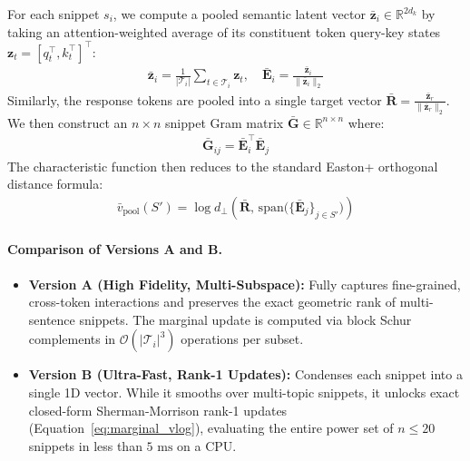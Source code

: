 \documentclass{article}
\begin{document}
For each snippet $s_i$, we compute a pooled semantic latent vector $\bar{\mathbf{z}}_i \in \mathbb{R}^{2d_k}$ by taking an attention-weighted average of its constituent token query-key states $\mathbf{z}_t = [q_t^\top, k_t^\top]^\top$:
\begin{align}
    \bar{\mathbf{z}}_i = \frac{1}{|\mathcal{T}_i|} \sum_{t \in \mathcal{T}_i} \mathbf{z}_t, \quad \bar{\mathbf{E}}_i = \frac{\bar{\mathbf{z}}_i}{\|\bar{\mathbf{z}}_i\|_2}
\end{align}
Similarly, the response tokens are pooled into a single target vector $\bar{\mathbf{R}} = \frac{\bar{\mathbf{z}}_r}{\|\bar{\mathbf{z}}_r\|_2}$. We then construct an $n \times n$ snippet Gram matrix $\bar{\mathbf{G}} \in \mathbb{R}^{n \times n}$ where:
\begin{align}
    \bar{\mathbf{G}}_{ij} = \bar{\mathbf{E}}_i^\top \bar{\mathbf{E}}_j
\end{align}
The characteristic function then reduces to the standard Easton+ orthogonal distance formula:
\begin{align}
    \bar{v}_{\text{pool}}(S') = \log d_{\perp}\left(\bar{\mathbf{R}}, \, \text{span}\big(\{\bar{\mathbf{E}}_j\}_{j \in S'}\big)\right)
\end{align}

\paragraph{Comparison of Versions A and B.} 
\begin{itemize}
    \item \textbf{Version A (High Fidelity, Multi-Subspace):} Fully captures fine-grained, cross-token interactions and preserves the exact geometric rank of multi-sentence snippets. The marginal update is computed via block Schur complements in $\mathcal{O}(|\mathcal{T}_i|^3)$ operations per subset.
    \item \textbf{Version B (Ultra-Fast, Rank-1 Updates):} Condenses each snippet into a single 1D vector. While it smooths over multi-topic snippets, it unlocks exact closed-form Sherman-Morrison rank-1 updates (Equation~\eqref{eq:marginal_vlog}), evaluating the entire power set of $n \le 20$ snippets in less than $5\text{ ms}$ on a CPU.
\end{itemize}






\appendix
\end{document}
